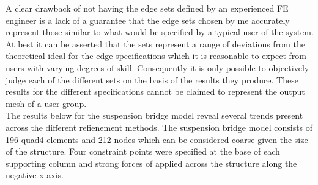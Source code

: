 \noindent
A clear drawback of not having the edge sets defined by an experienced FE engineer is a lack of a guarantee that the edge sets chosen by me accurately represent those similar to what would be specified by a typical user of the system. At best it can be asserted that the sets represent a range of deviations from the theoretical ideal for the edge specifications which it is reasonable to expect from users with varying degrees of skill. Consequently it is only possible to objectively judge each of the different sets on the basis of the results they produce. These results for the different specifications cannot be claimed to represent the output mesh of a user group.\\ 

\noindent
The results below for the suspension bridge model reveal several trends present across the different refienement methods. The suspension bridge model consists of 196 quad4 elements and 212 nodes which can be considered coarse given the size of the structure. Four constraint points were specified at the base of each supporting column and strong forces of applied across the structure along the negative x axis. \\ 




